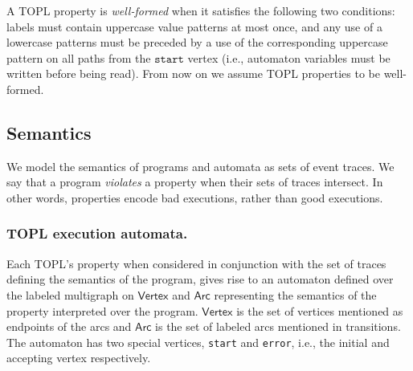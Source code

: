 \documentclass{llncs} %
\newcommand{\set}[1]{\ensuremath{\mathsf{#1}}}
\newcommand{\start}{\ensuremath{\mathtt{start}}\xspace}
\begin{document}
A TOPL property is \emph{well-formed} when it satisfies the following two conditions:
labels must contain uppercase value patterns at most once, and
any use of a lowercase patterns must be preceded by a use of the corresponding uppercase pattern on all paths from the \start vertex (i.e., automaton variables must be written before being read).
%
From now on we assume TOPL properties to be well-formed.



\subsection{Semantics}\label{sec:semantics} %
We model the semantics of programs and automata as sets of event traces.
We say that a program \emph{violates} a property when their sets of traces intersect.
In other words, properties encode bad executions, rather than good executions.

\subsubsection{TOPL execution automata.}
\newcommand{\World}{ExecState}

Each TOPL's property when considered in conjunction with the set of traces defining the semantics of the program,
gives rise to an automaton defined over the labeled multigraph  on $\set{Vertex}$ and $\set{Arc}$ representing the 
semantics of the property interpreted over the program.
$\set{Vertex}$ is the set of vertices mentioned as endpoints of the arcs and $\set{Arc}$ is the set of labeled arcs mentioned in transitions. The automaton has two special vertices, {\tt start} and {\tt error},  i.e., the initial and accepting vertex respectively. 
\end{document}
